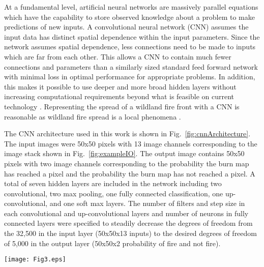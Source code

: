 \documentclass[smallcondensed]{svjour3}     %
\begin{document}
At a fundamental level, artificial neural networks are massively parallel
equations which have the capability to store observed knowledge about a
problem to make predictions of new inputs. A convolutional neural network
(CNN) assumes the input data has distinct
spatial dependence within the input parameters. Since the network
assumes spatial dependence, less connections need to be made to
inputs which are far from each other. This allows a CNN to contain much
fewer connections and parameters than a similarly sized standard feed
forward network with minimal loss in optimal performance for appropriate
problems. In addition, this makes it possible to use deeper and more broad hidden
layers without increasing computational requirements beyond what is
feasible on current technology \cite{krizhevsky2012imagenet}.
Representing the spread of a wildland fire front with a CNN is
reasonable as wildland fire spread is a local phenomena \cite{finney1999mechanistic}.

The CNN architecture used in this work is shown in Fig.~\ref{fig:cnnArchitecture}.
The input images were 50x50 pixels with 13 image channels corresponding to the
image stack shown in Fig.~\ref{fig:exampleIO}. The output image contains 50x50 pixels
with two image channels corresponding to the probability the burn map has reached
a pixel and the probability the burn map has not reached a pixel.
A total of seven hidden layers
are included in the network including two convolutional, two max pooling, one fully connected
classification, one up-convolutional, and one soft max layers. The number of filters
and step size in each convolutional and up-convolutional layers and number of neurons
in fully connected layers were specified to steadily decrease the degrees of freedom from the
32,500 in the input layer (50x50x13 inputs) to the desired degrees of freedom of
5,000 in the output layer (50x50x2 probability of fire and not fire).

\begin{figure*}[htb!]
\centering
  \texttt{[image: Fig3.eps]}
\caption{Convolutional Neural Network Architecture.}
\label{fig:cnnArchitecture}       %
\end{figure*}
\end{document}
